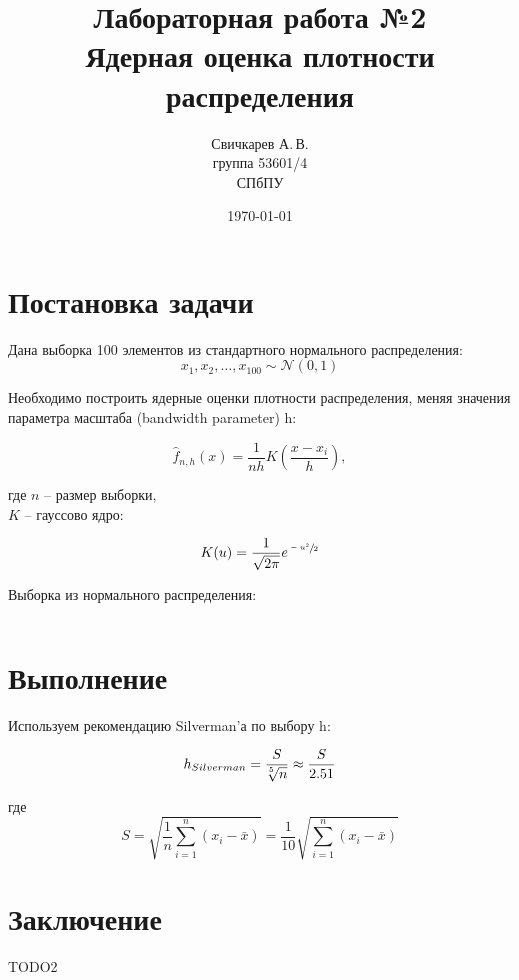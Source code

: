 \documentclass{article} %
\title{Лабораторная работа №2\\Ядерная оценка плотности распределения} %
\author{Свичкарев А.\,В.\\группа 53601/4\\СПбПУ} %
\date{\today} %
\begin{document}

\maketitle %

\section{Постановка задачи}
Дана выборка 100 элементов из стандартного нормального \mbox{распределения}:
\[x_1,x_2,\dotsc,x_{100}\sim\mathcal{N}(0,1)\]

Необходимо построить ядерные оценки плотности распределения, меняя значения параметра масштаба (bandwidth parameter) h:

\[\hat{f}_{n,h}(x) = \frac{1}{nh}K{\left(\frac{x-x_i}{h}\right)},\]

где $n$ -- размер выборки,\\
\indent $K$ -- гауссово ядро:

\[K(u) = \frac{1}{\sqrt{2\pi}}e^{\sfrac{-u^2}{2}}\]

Выборка из нормального распределения:
\\\newline
\begin{Verbatim}

\end{Verbatim}

\newpage
\section{Выполнение}
Используем рекомендацию Silverman'а по выбору h:

\[h_{Silverman} = \frac{S}{\sqrt[\leftroot{2}\uproot{2}5]{n}} \approx \frac{S}{2.51}\]

где \[S = \sqrt{\frac{1}{n}\sum_{i=1}^{n} (x_i-\bar{x})} = \frac{1}{10}\sqrt{\sum_{i=1}^{n}(x_i-\bar{x})}\]

\section{Заключение}
TODO2
\end{document}

